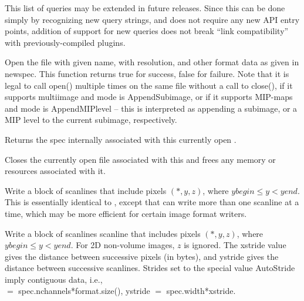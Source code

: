 \noindent This list of queries may be extended in future releases.
Since this can be done simply by recognizing new query strings, and does
not require any new API entry points, addition of support for new
queries does not break ``link compatibility'' with previously-compiled
plugins.
\apiend


Open the file with given {\kw name}, with resolution, and other format
data as given in {\kw newspec}.  This function returns {\kw true} for
success, {\kw false} for failure.  Note that it is legal to call 
{\kw open()} multiple times on the same file without a call to
{\kw close()}, if it supports multiimage and {\kw mode} is 
{\kw AppendSubimage}, or if it supports MIP-maps and {\kw mode} is 
{\kw AppendMIPlevel} -- this is interpreted as appending a subimage, or
a MIP level to the current subimage, respectively.

\apiend

Returns the spec internally associated with this currently open
\ImageOutput.
\apiend

Closes the currently open file associated with this \ImageOutput
and frees any memory or resources associated with it.
\apiend


Write a block of scanlines that include pixels $(*,y,z)$, where
$\mathit{ybegin} \le y < \mathit{yend}$.  This is 
essentially identical to \writescanline, except that can write more than
one scanline at a time, which may be more efficient for certain image
format writers.
\apiend


Write a block of scanlines scanline that includes pixels $(*,y,z)$,
where ${\mathit ybegin} \le y < {\mathit yend}$.  For 2D non-volume
images, $z$ is ignored.  The {\kw xstride} value gives the distance
between successive pixels (in bytes), and {\kw ystride} gives the 
distance between successive scanlines.  Strides set to the special value
{\kw AutoStride} imply contiguous data, i.e., \\  $=$
{\kw spec.nchannels*format.size()}, {\kw ystride} $=$ {\kw spec.width*xstride}.\\


